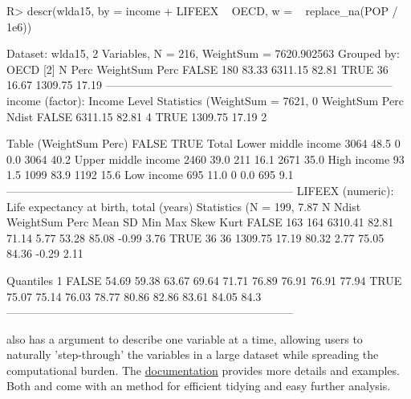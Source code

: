 \documentclass[article]{jss} %
\newcommand{\fct}[1]{\code{#1()}}
\begin{document}
%
\begin{Schunk}
\begin{Sinput}
R> descr(wlda15, by = income + LIFEEX ~ OECD, w = ~ replace_na(POP / 1e6))
\end{Sinput}
\begin{Soutput}
Dataset: wlda15, 2 Variables, N = 216, WeightSum = 7620.902563
Grouped by: OECD [2]
         N   Perc  WeightSum   Perc
FALSE  180  83.33    6311.15  82.81
TRUE    36  16.67    1309.75  17.19
-----------------------------------------------------------------------------
income (factor): Income Level
Statistics (WeightSum = 7621, 0% NAs)
       WeightSum   Perc  Ndist
FALSE    6311.15  82.81      4
TRUE     1309.75  17.19      2

Table (WeightSum Perc)
                         FALSE       TRUE      Total
Lower middle income  3064 48.5     0  0.0  3064 40.2
Upper middle income  2460 39.0   211 16.1  2671 35.0
High income            93  1.5  1099 83.9  1192 15.6
Low income            695 11.0     0  0.0   695  9.1
-----------------------------------------------------------------------------
LIFEEX (numeric): Life expectancy at birth, total (years)
Statistics (N = 199, 7.87% NAs)
         N  Ndist  WeightSum   Perc   Mean    SD    Min    Max   Skew  Kurt
FALSE  163    164    6310.41  82.81  71.14  5.77  53.28  85.08  -0.99  3.76
TRUE    36     36    1309.75  17.19  80.32  2.77  75.05  84.36  -0.29  2.11

Quantiles
          1%     5%    10%    25%    50%    75%    90%    95%    99%
FALSE  54.69  59.38  63.67  69.64  71.71  76.89  76.91  76.91  77.94
TRUE   75.07  75.14  76.03  78.77  80.86  82.86  83.61  84.05   84.3
-----------------------------------------------------------------------------
\end{Soutput}
\end{Schunk}

%
\fct{descr} also has a  argument to describe one variable at a time, allowing users to naturally 'step-through' the variables in a large dataset while spreading the computational burden. The \href{https://sebkrantz.github.io/collapse/reference/descr.html}{documentation} provides more details and examples. Both \fct{qsu} and \fct{descr} come with an  method for efficient tidying and easy further analysis. \newline
\end{document}
